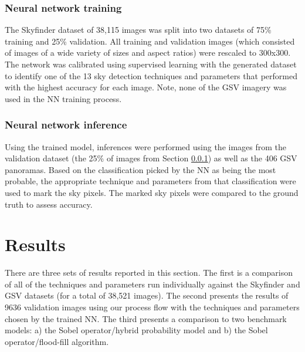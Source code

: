 \documentclass[final,3p,times,authoryear]{elsarticle}
\begin{document}
\subsubsection{Neural network training}\label{sec:nntraining}    

The Skyfinder dataset of 38,115 images was split into two datasets of 75\% training and 25\% validation. All training and validation images (which consisted of images of a wide variety of sizes and aspect ratios) were rescaled to 300x300. The network was calibrated using supervised learning with the generated dataset to identify one of the 13 sky detection techniques and parameters that performed with the highest accuracy for each image. Note, none of the GSV imagery was used in the NN training process.





\subsubsection{Neural network inference}\label{sec:nninference}    
Using the trained model, inferences were performed using the images from the validation dataset (the 25\% of images from Section \ref{sec:nntraining}) as well as the 406 GSV panoramas. Based on the classification picked by the NN as being the most probable, the appropriate technique and parameters from that classification were used to mark the sky pixels. The marked sky pixels were compared to the ground truth to assess accuracy.



\section{Results}\label{sec:results}


There are three sets of results reported in this section. The first is a comparison of all of the techniques and parameters run individually against the Skyfinder and GSV datasets (for a total of 38,521 images). The second presents the results of 9636  validation images using our process flow with the techniques and parameters chosen by the trained NN. The third presents a comparison to two benchmark models: a) the \cite{Wang2015a} Sobel operator/hybrid probability model and b) the \cite{Middel2018} Sobel operator/flood-fill algorithm.
\end{document}
